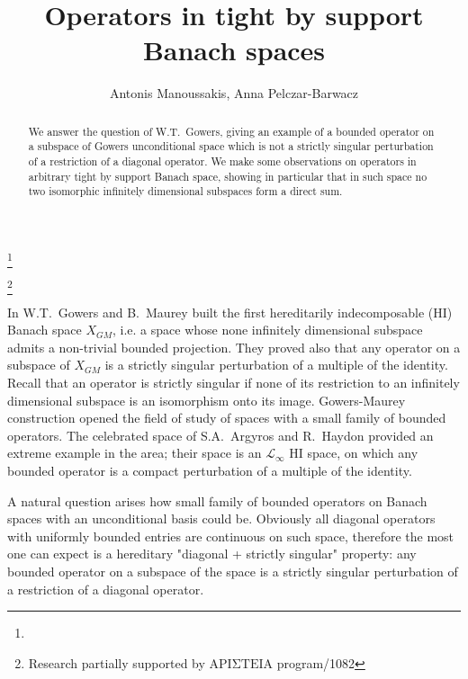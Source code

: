 \documentclass{amsart}
\numberwithin{subsection}{section}
\numberwithin{equation}{section}
\begin{document}
\title{Operators in tight by support Banach spaces}
\author{Antonis Manoussakis, Anna Pelczar-Barwacz}
\thanks{}
\address[A. Manoussakis]{Department  of Environmental Engineering, Technical University of Crete,\\ GR 73100, Greece}
\address[A. Pelczar-Barwacz]{Institute of Mathematics, Faculty of Mathematics and Computer Science, Jagiello\-nian University, {\L}ojasiewicza 6, 30-348 Kra\-k\'ow, Poland}
\thanks{Research partially supported by $\mathrm{API\Sigma TEIA}$ program/1082}

\begin{abstract}
We answer the question of W.T.~Gowers, giving an example of a bounded operator on a subspace of Gowers unconditional space which is not a strictly singular perturbation of a restriction of a diagonal operator. We make some observations on operators in arbitrary tight by support Banach space, showing in particular that in such space no two isomorphic infinitely dimensional subspaces form a direct sum. 
\end{abstract}

\maketitle

In \cite{GM0} W.T.~Gowers and B.~Maurey built the first hereditarily indecomposable (HI) Banach space $X_{GM}$, i.e. a space  whose none infinitely dimensional subspace admits a non-trivial bounded projection. They proved also that any operator on a subspace of $X_{GM}$ is a strictly singular perturbation of a multiple of the identity. Recall that an operator is strictly singular if none of its restriction to an infinitely dimensional subspace is an isomorphism onto its image. Gowers-Maurey construction opened the field of study of spaces with a small family of bounded operators. The celebrated space of S.A.~Argyros and R.~Haydon \cite{AH} provided an extreme example in the area; their space is an $\mathscr{L}_\infty$ HI space, on which any bounded operator is a compact perturbation of a multiple of the identity. 

A natural question arises how small family of bounded operators on Banach spaces with an unconditional basis could be. Obviously all diagonal operators with uniformly bounded entries are continuous on such space, therefore the most one can expect is a hereditary "diagonal + strictly singular" property: any bounded operator on a subspace of the space is a strictly singular perturbation of a restriction of a diagonal operator. 
\end{document}
